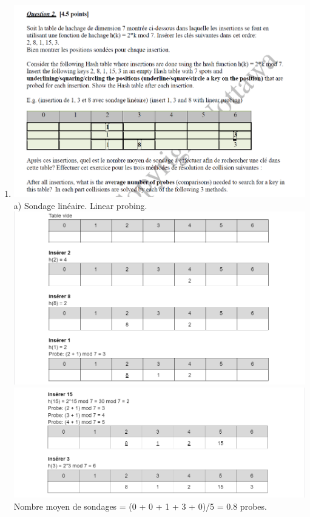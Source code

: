 \documentclass[12pt]{book}
\begin{document}
\begin{enumerate}
    \newpage
    
    \item 
    
    \includegraphics[scale=0.7]{d7q2q1.png}\\
    
    a) Sondage linéaire. Linear probing.\\
    \includegraphics[scale=0.7]{d7q2a1a.png}\\
    \newpage
    \includegraphics[scale=0.7]{d7q2a1b.png}\\
    Nombre moyen de sondages = (0 + 0 + 1 + 3 + 0)/5 = 0.8 probes.\\
    

\end{enumerate}
\end{document}

